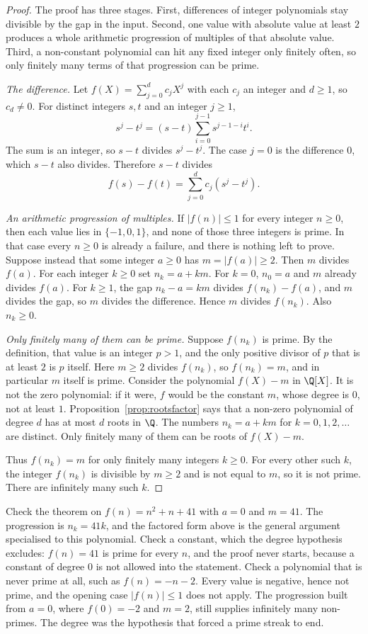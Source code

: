 \begin{proof}
The proof has three stages. First, differences of integer polynomials stay divisible by the gap in the input. Second, one value with absolute value at least $2$ produces a whole arithmetic progression of multiples of that absolute value. Third, a non-constant polynomial can hit any fixed integer only finitely often, so only finitely many terms of that progression can be prime.

\emph{The difference.} Let $f(X)=\sum_{j=0}^{d}c_jX^j$ with each $c_j$ an integer and $d\ge1$, so $c_d\ne0$. For distinct integers $s,t$ and an integer $j\ge1$,
\[
s^j-t^j=(s-t)\sum_{i=0}^{j-1}s^{j-1-i}t^i.
\]
The sum is an integer, so $s-t$ divides $s^j-t^j$. The case $j=0$ is the difference $0$, which $s-t$ also divides. Therefore $s-t$ divides
\[
f(s)-f(t)=\sum_{j=0}^{d}c_j(s^j-t^j).
\]

\emph{An arithmetic progression of multiples.} If $|f(n)|\le1$ for every integer $n\ge0$, then each value lies in $\{-1,0,1\}$, and none of those three integers is prime. In that case every $n\ge0$ is already a failure, and there is nothing left to prove. Suppose instead that some integer $a\ge0$ has $m=|f(a)|\ge2$. Then $m$ divides $f(a)$. For each integer $k\ge0$ set $n_k=a+km$. For $k=0$, $n_0=a$ and $m$ already divides $f(a)$. For $k\ge1$, the gap $n_k-a=km$ divides $f(n_k)-f(a)$, and $m$ divides the gap, so $m$ divides the difference. Hence $m$ divides $f(n_k)$. Also $n_k\ge0$.

\emph{Only finitely many of them can be prime.} Suppose $f(n_k)$ is prime. By the definition, that value is an integer $p>1$, and the only positive divisor of $p$ that is at least $2$ is $p$ itself. Here $m\ge2$ divides $f(n_k)$, so $f(n_k)=m$, and in particular $m$ itself is prime. Consider the polynomial $f(X)-m$ in $\Q[X]$. It is not the zero polynomial: if it were, $f$ would be the constant $m$, whose degree is $0$, not at least $1$. Proposition~\ref{prop:rootsfactor} says that a non-zero polynomial of degree $d$ has at most $d$ roots in $\Q$. The numbers $n_k=a+km$ for $k=0,1,2,\dots$ are distinct. Only finitely many of them can be roots of $f(X)-m$.

Thus $f(n_k)=m$ for only finitely many integers $k\ge0$. For every other such $k$, the integer $f(n_k)$ is divisible by $m\ge2$ and is not equal to $m$, so it is not prime. There are infinitely many such $k$.
\end{proof}

Check the theorem on $f(n)=n^2+n+41$ with $a=0$ and $m=41$. The progression is $n_k=41k$, and the factored form above is the general argument specialised to this polynomial. Check a constant, which the degree hypothesis excludes: $f(n)=41$ is prime for every $n$, and the proof never starts, because a constant of degree $0$ is not allowed into the statement. Check a polynomial that is never prime at all, such as $f(n)=-n-2$. Every value is negative, hence not prime, and the opening case $|f(n)|\le1$ does not apply. The progression built from $a=0$, where $f(0)=-2$ and $m=2$, still supplies infinitely many non-primes. The degree was the hypothesis that forced a prime streak to end.

